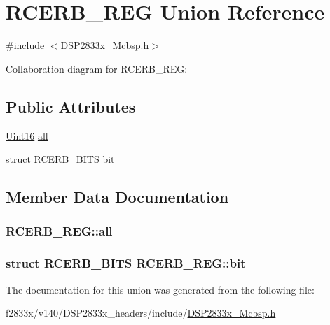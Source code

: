 \hypertarget{union_r_c_e_r_b___r_e_g}{}\section{R\+C\+E\+R\+B\+\_\+\+R\+E\+G Union Reference}
\label{union_r_c_e_r_b___r_e_g}


{\ttfamily \#include $<$D\+S\+P2833x\+\_\+\+Mcbsp.\+h$>$}



Collaboration diagram for R\+C\+E\+R\+B\+\_\+\+R\+E\+G\+:
\subsection*{Public Attributes}
\begin{DoxyCompactItemize}
\item 
\hyperlink{_d_s_p2833x___device_8h_a59a9f6be4562c327cbfb4f7e8e18f08b}{Uint16} \hyperlink{union_r_c_e_r_b___r_e_g_a3b2c9edb0c2a18c46dc6ae6bea1b7819}{all}
\item 
struct \hyperlink{struct_r_c_e_r_b___b_i_t_s}{R\+C\+E\+R\+B\+\_\+\+B\+I\+T\+S} \hyperlink{union_r_c_e_r_b___r_e_g_a5f8c95011c047d666c0ad95ca719f322}{bit}
\end{DoxyCompactItemize}


\subsection{Member Data Documentation}
\hypertarget{union_r_c_e_r_b___r_e_g_a3b2c9edb0c2a18c46dc6ae6bea1b7819}{}
\subsubsection[{all}]{ R\+C\+E\+R\+B\+\_\+\+R\+E\+G\+::all}\label{union_r_c_e_r_b___r_e_g_a3b2c9edb0c2a18c46dc6ae6bea1b7819}
\hypertarget{union_r_c_e_r_b___r_e_g_a5f8c95011c047d666c0ad95ca719f322}{}
\subsubsection[{bit}]{\setlength{\rightskip}{0pt plus 5cm}struct {\bf R\+C\+E\+R\+B\+\_\+\+B\+I\+T\+S} R\+C\+E\+R\+B\+\_\+\+R\+E\+G\+::bit}\label{union_r_c_e_r_b___r_e_g_a5f8c95011c047d666c0ad95ca719f322}


The documentation for this union was generated from the following file\+:\begin{DoxyCompactItemize}
\item 
f2833x/v140/\+D\+S\+P2833x\+\_\+headers/include/\hyperlink{_d_s_p2833x___mcbsp_8h}{D\+S\+P2833x\+\_\+\+Mcbsp.\+h}\end{DoxyCompactItemize}
